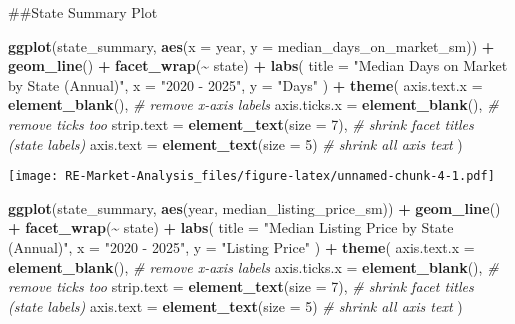 \documentclass[
]{article}
\newenvironment{Shaded}{\begin{snugshade}}{\end{snugshade}}
\newcommand{\AttributeTok}[1]{\textcolor[rgb]{0.13,0.29,0.53}{#1}}
\newcommand{\CommentTok}[1]{\textcolor[rgb]{0.56,0.35,0.01}{\textit{#1}}}
\newcommand{\DecValTok}[1]{\textcolor[rgb]{0.00,0.00,0.81}{#1}}
\newcommand{\FunctionTok}[1]{\textcolor[rgb]{0.13,0.29,0.53}{\textbf{#1}}}
\newcommand{\NormalTok}[1]{#1}
\newcommand{\SpecialCharTok}[1]{\textcolor[rgb]{0.81,0.36,0.00}{\textbf{#1}}}
\newcommand{\StringTok}[1]{\textcolor[rgb]{0.31,0.60,0.02}{#1}}
\begin{document}
\#\#State Summary Plot

\begin{Shaded}
\begin{Highlighting}[]
\FunctionTok{ggplot}\NormalTok{(state\_summary, }\FunctionTok{aes}\NormalTok{(}\AttributeTok{x =}\NormalTok{ year, }\AttributeTok{y =}\NormalTok{ median\_days\_on\_market\_sm)) }\SpecialCharTok{+}
  \FunctionTok{geom\_line}\NormalTok{() }\SpecialCharTok{+}
  \FunctionTok{facet\_wrap}\NormalTok{(}\SpecialCharTok{\textasciitilde{}}\NormalTok{ state) }\SpecialCharTok{+}
  \FunctionTok{labs}\NormalTok{(}
    \AttributeTok{title =} \StringTok{"Median Days on Market by State (Annual)"}\NormalTok{,}
    \AttributeTok{x =} \StringTok{"2020 {-} 2025"}\NormalTok{,}
    \AttributeTok{y =} \StringTok{"Days"}
\NormalTok{  ) }\SpecialCharTok{+}
  \FunctionTok{theme}\NormalTok{(}
    \AttributeTok{axis.text.x =} \FunctionTok{element\_blank}\NormalTok{(),   }\CommentTok{\# remove x{-}axis labels}
    \AttributeTok{axis.ticks.x =} \FunctionTok{element\_blank}\NormalTok{(),  }\CommentTok{\# remove ticks too}
    \AttributeTok{strip.text =} \FunctionTok{element\_text}\NormalTok{(}\AttributeTok{size =} \DecValTok{7}\NormalTok{),  }\CommentTok{\# shrink facet titles (state labels)}
    \AttributeTok{axis.text =} \FunctionTok{element\_text}\NormalTok{(}\AttributeTok{size =} \DecValTok{5}\NormalTok{)    }\CommentTok{\# shrink all axis text}
\NormalTok{  )}
\end{Highlighting}
\end{Shaded}

\texttt{[image: RE-Market-Analysis\_files/figure-latex/unnamed-chunk-4-1.pdf]}

\begin{Shaded}
\begin{Highlighting}[]
\FunctionTok{ggplot}\NormalTok{(state\_summary, }\FunctionTok{aes}\NormalTok{(year, median\_listing\_price\_sm)) }\SpecialCharTok{+}
  \FunctionTok{geom\_line}\NormalTok{() }\SpecialCharTok{+}
  \FunctionTok{facet\_wrap}\NormalTok{(}\SpecialCharTok{\textasciitilde{}}\NormalTok{ state) }\SpecialCharTok{+}
  \FunctionTok{labs}\NormalTok{(}
    \AttributeTok{title =} \StringTok{"Median Listing Price by State (Annual)"}\NormalTok{,}
    \AttributeTok{x =} \StringTok{"2020 {-} 2025"}\NormalTok{,}
    \AttributeTok{y =} \StringTok{"Listing Price"}
\NormalTok{  ) }\SpecialCharTok{+}
  \FunctionTok{theme}\NormalTok{(}
    \AttributeTok{axis.text.x =} \FunctionTok{element\_blank}\NormalTok{(),   }\CommentTok{\# remove x{-}axis labels}
    \AttributeTok{axis.ticks.x =} \FunctionTok{element\_blank}\NormalTok{(),  }\CommentTok{\# remove ticks too}
    \AttributeTok{strip.text =} \FunctionTok{element\_text}\NormalTok{(}\AttributeTok{size =} \DecValTok{7}\NormalTok{),  }\CommentTok{\# shrink facet titles (state labels)}
    \AttributeTok{axis.text =} \FunctionTok{element\_text}\NormalTok{(}\AttributeTok{size =} \DecValTok{5}\NormalTok{)    }\CommentTok{\# shrink all axis text}
\NormalTok{  )}
\end{Highlighting}
\end{Shaded}
\end{document}
